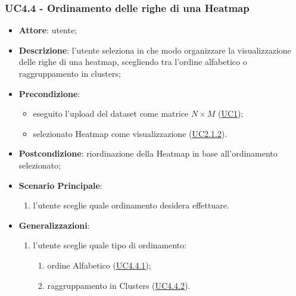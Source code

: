     \subsubsection{UC4.4 - Ordinamento delle righe di una Heatmap}
    \label{uc4.4}
    
    \begin{itemize}
    \item \textbf{Attore}: utente;
    \item \textbf{Descrizione}: l'utente seleziona in che modo organizzare la visualizzazione delle righe di una heatmap, scegliendo tra l'ordine alfabetico o raggruppamento in clusters;
    \item \textbf{Precondizione}: 
    \begin{itemize}
        \item eseguito l'upload del dataset come matrice $N\times M$ (\hyperref[uc1]{UC1});
        \item selezionato Heatmap come visualizzazione (\hyperref[uc2.1.2]{UC2.1.2}).
    \end{itemize}  
    \item \textbf{Postcondizione}: riordinazione della Heatmap in base all'ordinamento selezionato;
    \item \textbf{Scenario Principale}: 
    \begin{enumerate}
        \item l'utente sceglie quale ordinamento desidera effettuare.
    \end{enumerate}  
    \item \textbf{Generalizzazioni}: 
     \begin{enumerate}
            \item l'utente sceglie quale tipo di ordinamento:
                \begin{enumerate}
                    \item ordine Alfabetico (\hyperref[uc4.4.1]{UC4.4.1});
                    \item raggruppamento in Clusters (\hyperref[uc4.4.2]{UC4.4.2}).
                    \end{enumerate}
        \end{enumerate} 
    \end{itemize}
    
